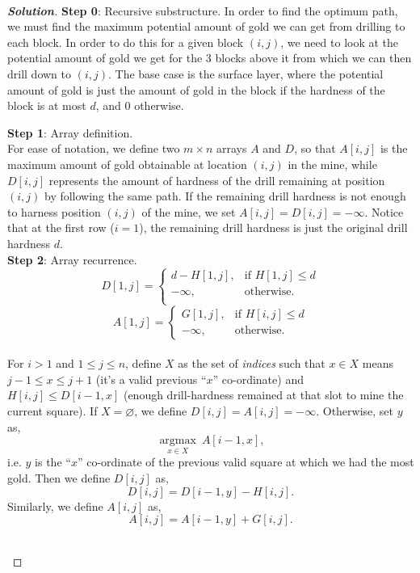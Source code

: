 \documentclass[a4paper,twoside,10pt]{report}
\newcommand{\marginline}{\noindent\makebox[\linewidth][r]{\rule{\textwidth}{1pt}}}
\newcommand{\exer}[1]{\noindent{\Large\textsc{Question #1}} \\ \marginline}
\newenvironment{soln}{\begin{proof}[\textit{\textbf{Solution}}]}{\\ \end{proof}}
\newenvironment{exercise}[1]{\exer{#1}}{}
\begin{document}

\begin{exercise}{2}

\begin{soln} 
\textbf{Step 0}: Recursive substructure. In order to find the optimum path, we must find the maximum potential amount of gold we can get from drilling to each block. In order to do this for a given block $(i, j)$, we need to look at the potential amount of gold we get for the 3 blocks above it from which we can then drill down to $(i, j)$. The base case is the surface layer, where the potential amount of gold is just the amount of gold in the block if the hardness of the block is at most $d$, and 0 otherwise.

\noindent\textbf{Step 1}: Array definition. \\

For ease of notation, we define two $m \times n$ arrays $A$ and $D$, so that $A[i, j]$ is the maximum amount of gold obtainable at location $(i, j)$ in the mine, while $D[i, j]$ represents the amount of hardness of the drill remaining at position $(i, j)$ by following the same path. If the remaining drill hardness is not enough to harness position $(i, j)$ of the mine, we set $A[i, j] = D[i, j] = -\infty$. Notice that at the first row ($i = 1$), the remaining drill hardness is just the original drill hardness $d$.\\

\noindent\textbf{Step 2}: Array recurrence.
\[
 D[1, j] =
  \begin{cases}
   d - H[1, j], & \text{if } H[1, j] \leq d\\
   -\infty, & \text{otherwise.}\\
  \end{cases}
\]
\[
 A[1, j] = 
  \begin{cases}
   G[1, j], & \text{if } H[i, j] \leq d\\
   - \infty, & \text{otherwise.} 
  \end{cases}
\] \\
For $i > 1$ and $1 \leq j \leq n$, define $X$ as the set of \emph{indices} such that $x \in X$ means $j - 1 \leq x \leq j + 1$ (it's a valid previous ``$x$'' co-ordinate) and $H[i, j] \leq D[i-1, x]$ (enough drill-hardness remained at that slot to mine the current square). If $X = \varnothing$, we define $D[i, j] = A[i, j] = -\infty$. Otherwise, set $y$ as, \[\underset{x\in X}{\operatorname{argmax}}\ A[i - 1, x],\] i.e. $y$ is the ``$x$'' co-ordinate of the previous valid square at which we had the most gold.
Then we define $D[i, j]$ as,
\[
 D[i, j] =
   D[i - 1, y] - H[i, j].
\]
Similarly, we define $A[i, j]$ as,
\[
 A[i, j] =
   A[i - 1, y] + G[i, j].
\] 


\end{soln}
\end{exercise}
\end{document}
